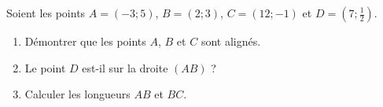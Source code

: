 
\begin{exercice}\label{exosmath-0062}

    Soient les points \( A=(-3;5)\), \( B=(2;3)\), \( C=(12;-1)\) et \( D=(7;\frac{ 1 }{2})\).
    \begin{enumerate}
        \item
            Démontrer que les points \( A\), \( B\) et \( C\) sont alignés.
        \item
            Le point \( D\) est-il sur la droite \( (AB)\) ?
        \item
            Calculer les longueurs \( AB\) et \( BC\).
    \end{enumerate}

\end{exercice}
